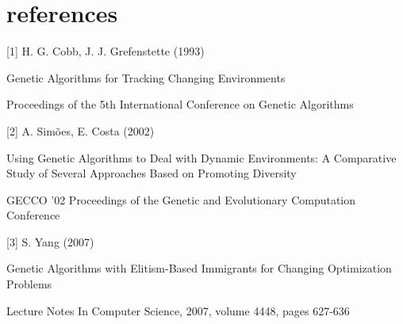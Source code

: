 \documentclass[a4paper,12pt]{article}
\begin{document}



\section{references}
[1] H. G. Cobb, J. J. Grefenstette (1993)

Genetic Algorithms for Tracking Changing Environments

Proceedings of the 5th International Conference on Genetic Algorithms

[2] A. Simões, E. Costa (2002)

Using Genetic Algorithms to Deal with Dynamic Environments: A Comparative Study of Several Approaches Based on Promoting Diversity

GECCO '02 Proceedings of the Genetic and Evolutionary Computation Conference

[3] S. Yang (2007)

Genetic Algorithms with Elitism-Based Immigrants for Changing Optimization Problems

Lecture Notes In Computer Science, 2007, volume 4448, pages 627-636
\end{document}
